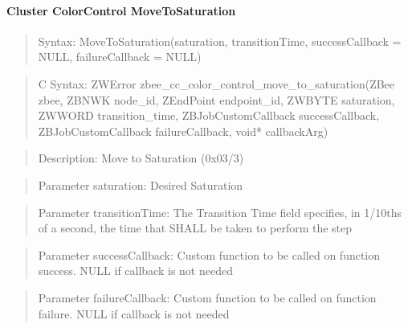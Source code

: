 \paragraph{Cluster ColorControl MoveToSaturation}
\begin{quote}Syntax: MoveToSaturation(saturation, transitionTime, successCallback = NULL, failureCallback = NULL)\end{quote}
\begin{quote}C Syntax: ZWError zbee\_cc\_color\_control\_move\_to\_saturation(ZBee zbee, ZBNWK node\_id, ZEndPoint endpoint\_id, ZWBYTE saturation, ZWWORD transition\_time, ZBJobCustomCallback successCallback, ZBJobCustomCallback failureCallback, void* callbackArg)\end{quote}
\begin{quote}Description: Move to Saturation (0x03/3)\end{quote}
\begin{quote}Parameter saturation: Desired Saturation\end{quote}
\begin{quote}Parameter transitionTime: The Transition Time field specifies, in 1/10ths of a second, the time that SHALL be taken to perform the step\end{quote}
\begin{quote}Parameter successCallback: Custom function to be called on function success. NULL if callback is not needed\end{quote}
\begin{quote}Parameter failureCallback: Custom function to be called on function failure. NULL if callback is not needed\end{quote}


